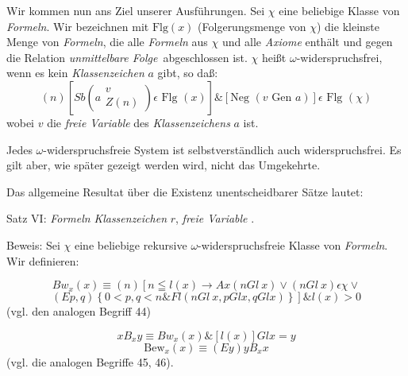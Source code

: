 \documentclass[draft]{scrartcl}
\begin{document}
Wir kommen nun ans Ziel unserer Ausführungen. Sei $\chi$ eine beliebige Klasse von
\textit{Formeln}. Wir bezeichnen mit $\text{Flg}\left(x\right)$ (Folgerungsmenge von
$\chi$) die kleinste Menge von \textit{Formeln}, die alle \textit{Formeln} aus $\chi$
und alle \textit{Axiome} enthält und gegen die Relation
\glqq\textit{unmittelbare Folge}\grqq\ abgeschlossen ist. $\chi$ heißt
$\omega$-widerspruchsfrei, wenn es kein \textit{Klassenzeichen} $a$ gibt, so daß:
\begin{equation*}
	\left(n\right)\left[Sb\left(a\substack{v\\ Z\left(n\right)}\right) \epsilon \text{ Flg } \left(x\right)\right] \& \left[\text{Neg }\left(v\text{ Gen } a\right)\right] \epsilon \text{ Flg }\left(\chi\right)
\end{equation*}
wobei $v$ die \textit{freie Variable} des \textit{Klassenzeichens} $a$ ist.

Jedes $\omega$-widerspruchsfreie System ist selbstverständlich auch widerspruchsfrei. Es gilt aber,
wie später gezeigt werden wird, nicht das Umgekehrte.

Das allgemeine Resultat über die Existenz unentscheidbarer Sätze lautet:

Satz VI:  \textit{Formeln}  \textit{Klassenzeichen} $r$,  \textit{freie Variable} .

Beweis: Sei $\chi$ eine beliebige rekursive $\omega$-widerspruchsfreie Klasse von \textit{Formeln}. Wir definieren:

\begin{equation}
	Bw_x\left(x\right) \equiv \left(n\right) \left[ n \leqq l\left(x\right) \longrightarrow Ax\left(n Gl\ x\right) \lor \left(n Gl\ x\right) \epsilon \chi \lor\right.
\end{equation}
\begin{equation*}
	\left.\left(Ep, q\right) \left\{0 < p, q < n \& Fl\left(n Gl\ x, p Gl x, q Gl x\right)\right\}\right] \& l\left(x\right) > 0
\end{equation*}
(vgl. den analogen Begriff 44)

\begin{equation}
	x B_x y \equiv Bw_x\left(x\right) \& \left[l\left(x\right)\right] Gl x = y
\end{equation}
\begin{equation}
	\tag{6.1}
	\text{Bew}_x\left(x\right) \equiv \left(Ey\right) y B_x x
\end{equation}
(vgl. die analogen Begriffe 45, 46).
\end{document}
